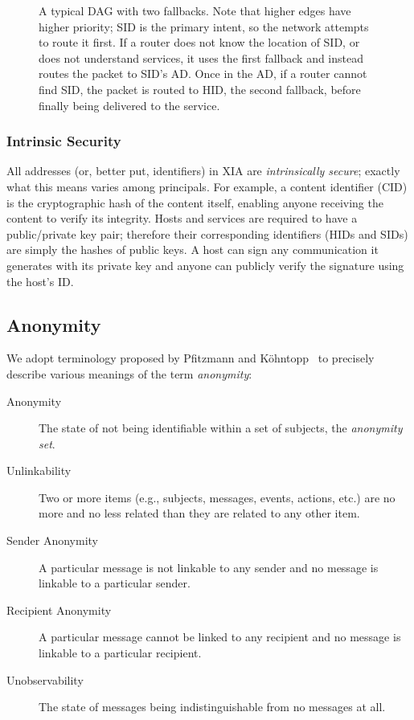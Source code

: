 \documentclass{article}
\newcommand{\entrynode}[1]{
  \SetVertexNormal[Shape      = circle,
                   FillColor  = black,
                   LineWidth  = 0pt,
                   MinSize    = 0pt]
  \Vertex[L={\tiny\,}]{#1}
  \SetVertexNormal[Shape      = circle,
                   FillColor  = white,
                   LineWidth  = 2pt]
}
\begin{document}
\begin{figure}
\centering
{}
\caption{A typical DAG with two fallbacks. Note that higher edges have higher priority; SID is the primary intent, so the network attempts to route it first. If a router does not know the location of SID, or does not understand services, it uses the first fallback and instead routes the packet to SID's AD. Once in the AD, if a router cannot find SID, the packet is routed to HID, the second fallback, before finally being delivered to the service.}
\label{fig:proxy-service}
\end{figure}


\subsubsection{Intrinsic Security}
All addresses (or, better put, identifiers) in XIA are \emph{intrinsically secure}; exactly what this means varies among principals. For example, a content identifier (CID) is the cryptographic hash of the content itself, enabling anyone receiving the content to verify its integrity. Hosts and services are required to have a public/private key pair; therefore their corresponding identifiers (HIDs and SIDs) are simply the hashes of public keys. A host can sign any communication it generates with its private key and anyone can publicly verify the signature using the host's ID.

\subsection{Anonymity}
We adopt terminology proposed by Pfitzmann and K\"{o}hntopp~\cite{terminology} to precisely describe various meanings of the term {\em anonymity}:
\begin{description}
\item[Anonymity] The state of not being identifiable within a set of subjects, the {\em anonymity set}.
\item[Unlinkability] Two or more items (e.g., subjects, messages, events, actions, etc.) are no more and no less related than they are related to any other item.
\item[Sender Anonymity] A particular message is not linkable to any sender and no message is linkable to a particular sender.
\item[Recipient Anonymity] A particular message cannot be linked to any recipient and no message is linkable to a particular recipient.
\item[Unobservability] The state of messages being indistinguishable from no messages at all.
\end{description}
\end{document}
